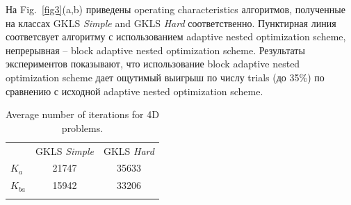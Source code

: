 \documentclass[runningheads]{llncs}
\begin{document}
На Fig.~\ref{fig3}(a,b) приведены operating characteristics алгоритмов, полученные на классах GKLS \textit{Simple} and GKLS \textit{Hard} соответственно. Пунктирная линия соответсвует алгоритму с использованием adaptive nested optimization scheme, непрерывная --  block adaptive nested optimization scheme. 
Результаты экспериментов показывают, что использование block adaptive nested optimization scheme дает ощутимый выигрыш по числу trials (до 35\%) по сравнению с исходной adaptive nested optimization scheme.

\begin{table}
\centering
\caption{Average number of iterations for 4D problems.}\label{tab2}
\begin{tabular}{lcc}
\hline\noalign{\smallskip}
 &    GKLS \textit{Simple} &  GKLS \textit{Hard} \\
\noalign{\smallskip}\hline\noalign{\smallskip}
 $K_a$  &  21747 & 35633 \\
 $K_{ba}$ &  15942 & 33206 \\
\noalign{\smallskip}\hline
\end{tabular}
\end{table}
\end{document}
